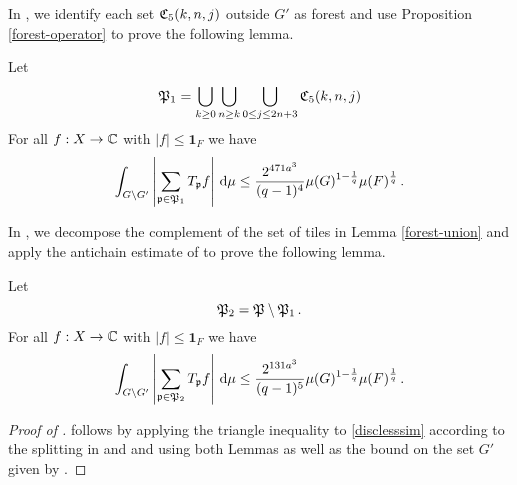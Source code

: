 In , we identify each set ${\mathfrak C}_5(k,n,j)$ outside $G'$ as forest and use Proposition
\ref{forest-operator} to prove the following lemma.

\begin{lemma}
    \label{forest-union}
    \leanok
    Let
    \begin{equation}
        {\mathfrak P}_1 =\bigcup_{k\ge 0}\bigcup_{n\ge k}
        \bigcup_{0\le j\le 2n+3}{\mathfrak C}_5(k,n,j)
    \end{equation}
    For all $f:X\to \mathbb{C}$ with $|f|\le \mathbf{1}_F$ we have
    \begin{equation}
        \label{disclesssim1}
        \int_{G \setminus G'} \left|\sum_{{\mathfrak p} \in {\mathfrak P}_1} T_{{\mathfrak p}} f \right|\, \mathrm{d}\mu \le \frac{2^{471a^3}}{(q-1)^4} \mu(G)^{1 - \frac{1}{q}} \mu(F)^{\frac{1}{q}}\,.
    \end{equation}
\end{lemma}

In , we decompose
the complement of the set of tiles in Lemma
\ref{forest-union} and apply the antichain estimate of
 to prove the following lemma.

\begin{lemma}
    \label{forest-complement}
    \leanok
    Let
    \begin{equation}
        {\mathfrak P}_2 ={\mathfrak P}\setminus {\mathfrak P}_1\,.
    \end{equation}
    For all $f:X\to \mathbb{C}$ with $|f|\le \mathbf{1}_F$ we have
    \begin{equation}
        \label{disclesssim2}
        \int_{G \setminus G'} \left|\sum_{{\mathfrak p} \in {\mathfrak P}_2} T_{{\mathfrak p}} f\right| \, \mathrm{d}\mu \le \frac{2^{131a^3}}{(q-1)^5} \mu(G)^{1 - \frac{1}{q}} \mu(F)^{\frac{1}{q}}\,.
    \end{equation}
\end{lemma}

\begin{proof}[Proof of ]
\leanok
{}
 follows by applying the
triangle inequality to \eqref{disclesssim}
according to the splitting in 
and  and using both Lemmas as well
as the bound on the set $G'$ given by .
\end{proof}

